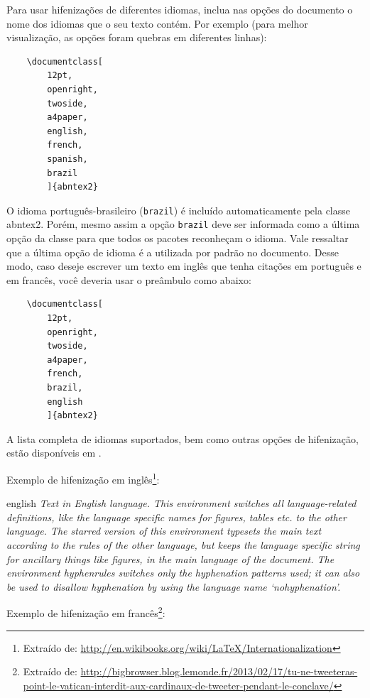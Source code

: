     Para usar hifenizações de diferentes idiomas, inclua nas opções do documento o
    nome dos idiomas que o seu texto contém. Por exemplo (para melhor
    visualização, as opções foram quebras em diferentes linhas):

    \begin{verbatim}
    \documentclass[
    	12pt,
    	openright,
    	twoside,
    	a4paper,
    	english,
    	french,
    	spanish,
    	brazil
    	]{abntex2}
    \end{verbatim}

    O idioma português-brasileiro (\texttt{brazil}) é incluído automaticamente pela
    classe \textsf{abntex2}. Porém, mesmo assim a opção \texttt{brazil} deve ser
    informada como a última opção da classe para que todos os pacotes reconheçam o
    idioma. Vale ressaltar que a última opção de idioma é a utilizada por padrão no
    documento. Desse modo, caso deseje escrever um texto em inglês que tenha
    citações em português e em francês, você deveria usar o preâmbulo como abaixo:

    \begin{verbatim}
    \documentclass[
    	12pt,
    	openright,
    	twoside,
    	a4paper,
    	french,
    	brazil,
    	english
    	]{abntex2}
    \end{verbatim}

    A lista completa de idiomas suportados, bem como outras opções de hifenização,
    estão disponíveis em .

    Exemplo de hifenização em inglês\footnote{Extraído de:
    \url{http://en.wikibooks.org/wiki/LaTeX/Internationalization}}:

    \begin{otherlanguage*}{english}
    \textit{Text in English language. This environment switches all language-related
    definitions, like the language specific names for figures, tables etc. to the other
    language. The starred version of this environment typesets the main text
    according to the rules of the other language, but keeps the language specific
    string for ancillary things like figures, in the main language of the document.
    The environment hyphenrules switches only the hyphenation patterns used; it can
    also be used to disallow hyphenation by using the language name
    `nohyphenation'.}
    \end{otherlanguage*}

    Exemplo de hifenização em francês\footnote{Extraído de:
    \url{http://bigbrowser.blog.lemonde.fr/2013/02/17/tu-ne-tweeteras-point-le-vatican-interdit-aux-cardinaux-de-tweeter-pendant-le-conclave/}}:

